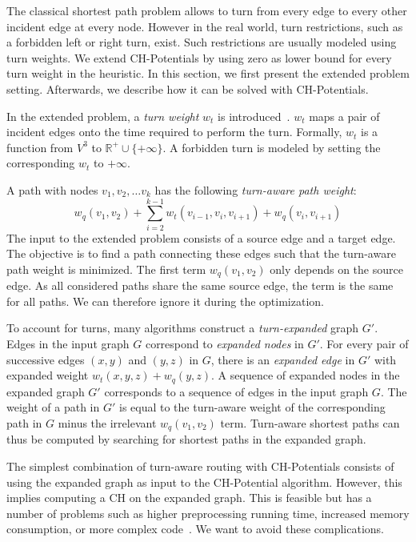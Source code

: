 \documentclass[letterpaper]{article} %
\begin{document}
The classical shortest path problem allows to turn from every edge to every other incident edge at every node.
However in the real world, turn restrictions, such as a forbidden left or right turn, exist.
Such restrictions are usually modeled using turn weights.
We extend CH-Potentials by using zero as lower bound for every turn weight in the heuristic.
In this section, we first present the extended problem setting.
Afterwards, we describe how it can be solved with CH-Potentials.

In the extended problem, a \emph{turn weight} $w_t$ is introduced~\cite{gv-errnt-11,dgpw-crprn-13,bwzz-cchtc-20}.
$w_t$ maps a pair of incident edges onto the time required to perform the turn.
Formally, $w_t$ is a function from $V^3$ to $\mathbb{R}^+ \cup \{+\infty\}$.
A forbidden turn is modeled by setting the corresponding $w_t$ to $+\infty$.

A path with nodes $v_1, v_2,\ldots v_k$ has the following \emph{turn-aware path weight}:\[
w_q(v_1, v_2) + \sum_{i=2}^{k-1}  w_t(v_{i-1},v_i,v_{i+1})  + w_q(v_i,v_{i+1})
\] The input to the extended problem consists of a source edge and a target edge.
The objective is to find a path connecting these edges such that the turn-aware path weight is minimized.
The first term $w_q(v_1, v_2)$ only depends on the source edge.
As all considered paths share the same source edge, the term is the same for all paths.
We can therefore ignore it during the optimization.

To account for turns, many algorithms construct a \emph{turn-expanded} graph $G'$.
Edges in the input graph $G$ correspond to \emph{expanded nodes} in $G'$.
For every pair of successive edges $(x,y)$ and $(y,z)$ in $G$, there is an \emph{expanded edge} in $G'$ with expanded weight $w_t(x,y,z) + w_q(y,z)$.
A sequence of expanded nodes in the expanded graph $G'$ corresponds to a sequence of edges in the input graph $G$.
The weight of a path in $G'$ is equal to the turn-aware weight of the corresponding path in $G$ minus the irrelevant $w_q(v_1,v_2)$ term.
Turn-aware shortest paths can thus be computed by searching for shortest paths in the expanded graph.

The simplest combination of turn-aware routing with CH-Potentials consists of using the expanded graph as input to the CH-Potential algorithm.
However, this implies computing a CH on the expanded graph.
This is feasible but has a number of problems such as higher preprocessing running time, increased memory consumption, or more complex code~\cite{gv-errnt-11}.
We want to avoid these complications.
\end{document}
